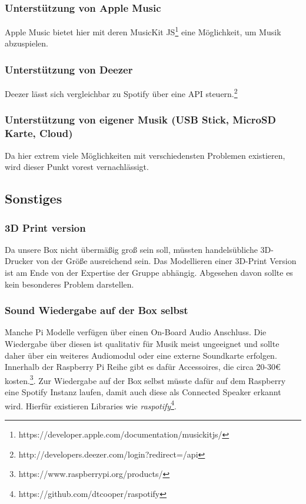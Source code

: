 \documentclass[10pt, a4paper]{article}
\begin{document}
\subsubsection{Unterstützung von Apple Music}
Apple Music bietet hier mit deren MusicKit JS\footnote{https://developer.apple.com/documentation/musickitjs/} eine Möglichkeit, um Musik abzuspielen.

\subsubsection{Unterstützung von Deezer}
Deezer lässt sich vergleichbar zu Spotify über eine API steuern.\footnote{http://developers.deezer.com/login?redirect=/api}

\subsubsection{Unterstützung von eigener Musik (USB Stick, MicroSD Karte, Cloud)}
Da hier extrem viele Möglichkeiten mit verschiedensten Problemen existieren, wird dieser Punkt vorest vernachlässigt.

\subsection{Sonstiges}
\subsubsection{3D Print version}
Da unsere Box nicht übermäßig groß sein soll, müssten handelsübliche 3D-Drucker von der Größe ausreichend sein.
Das Modellieren einer 3D-Print Version ist am Ende von der Expertise der Gruppe abhängig.
Abgesehen davon sollte es kein besonderes Problem darstellen.

\subsubsection{Sound Wiedergabe auf der Box selbst}
Manche Pi Modelle verfügen über einen On-Board Audio Anschluss.
Die Wiedergabe über diesen ist qualitativ für Musik meist ungeeignet und sollte daher über ein weiteres Audiomodul oder eine externe Soundkarte erfolgen.
Innerhalb der Raspberry Pi Reihe gibt es dafür Accessoires, die circa 20-30€ kosten.\footnote{https://www.raspberrypi.org/products/}.
Zur Wiedergabe auf der Box selbst müsste dafür auf dem Raspberry eine Spotify Instanz laufen, damit auch diese als Connected Speaker erkannt wird.
Hierfür existieren Libraries wie \textit{raspotify}\footnote{https://github.com/dtcooper/raspotify}.
\end{document}
